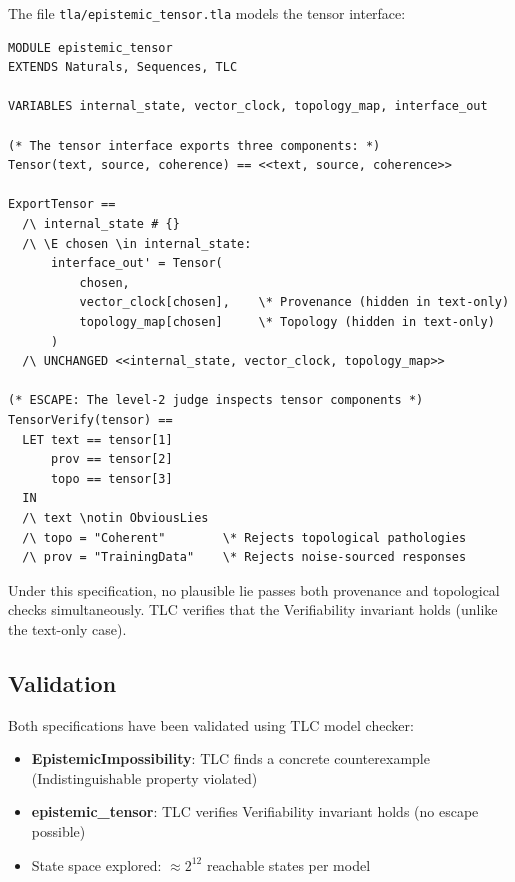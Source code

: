 \documentclass[12pt]{article}
\begin{document}
The file \texttt{tla/epistemic\_tensor.tla} models the tensor interface:

\begin{lstlisting}[caption=TLA+ Tensor Model (excerpt), label=lst:tla-tensor]
MODULE epistemic_tensor
EXTENDS Naturals, Sequences, TLC

VARIABLES internal_state, vector_clock, topology_map, interface_out

(* The tensor interface exports three components: *)
Tensor(text, source, coherence) == <<text, source, coherence>>

ExportTensor ==
  /\ internal_state # {}
  /\ \E chosen \in internal_state:
      interface_out' = Tensor(
          chosen,
          vector_clock[chosen],    \* Provenance (hidden in text-only)
          topology_map[chosen]     \* Topology (hidden in text-only)
      )
  /\ UNCHANGED <<internal_state, vector_clock, topology_map>>

(* ESCAPE: The level-2 judge inspects tensor components *)
TensorVerify(tensor) ==
  LET text == tensor[1]
      prov == tensor[2]
      topo == tensor[3]
  IN
  /\ text \notin ObviousLies
  /\ topo = "Coherent"        \* Rejects topological pathologies
  /\ prov = "TrainingData"    \* Rejects noise-sourced responses
\end{lstlisting}

Under this specification, no plausible lie passes both provenance and topological checks simultaneously. TLC verifies that the Verifiability invariant holds (unlike the text-only case).

\subsection{Validation}

Both specifications have been validated using TLC model checker:
\begin{itemize}
    \item \textbf{EpistemicImpossibility}: TLC finds a concrete counterexample (Indistinguishable property violated)
    \item \textbf{epistemic\_tensor}: TLC verifies Verifiability invariant holds (no escape possible)
    \item State space explored: $\approx 2^{12}$ reachable states per model
\end{itemize}

\end{document}

